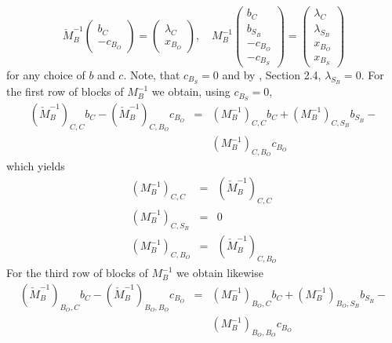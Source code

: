 \documentclass[a4paper]{article}
\begin{document}
\begin{equation}
\check{M}_{B}^{-1}
\left(\begin{array}{c}
        b_{C} \\
	\hline
	-c_{B_{O}}
       \end{array}
\right)
=
\left(\begin{array}{c}
        \lambda_{C} \\
	\hline
	x_{B_{O}}
      \end{array}
\right), 
\quad
M_{B}^{-1}
\left(\begin{array}{c}
        b_{C} \\
	\hline
	b_{S_{B}} \\
	\hline
	-c_{B_{O}} \\
	\hline
	-c_{B_{S}}
       \end{array}
\right)
=
\left(\begin{array}{c}
        \lambda_{C} \\
	\hline
	\lambda_{S_{B}} \\
	\hline
	x_{B_{O}}  \\
	\hline
	x_{B_{S}}
       \end{array}
\right)
\end{equation}
for any choice of $b$ and $c$. Note, that $c_{B_{S}}=0$ and by \cite{Sven},
Section 2.4, $\lambda_{S_{B}}=0$. 
For the first row of blocks of $M_{B}^{-1}$ we obtain, using $c_{B_{S}}=0$,
\begin{eqnarray*}
\left(\check{M}_{B}^{-1}\right)_{C, C} b_{C}
 -\left(\check{M}_{B}^{-1}\right)_{C, B_{O}} c_{B_{O}}
&=&   
\left(M_{B}^{-1}\right)_{C, C} b_{C}
 +\left(M_{B}^{-1}\right)_{C, S_{B}} b_{S_{B}} - \\
&& 
 \left(M_{B}^{-1}\right)_{C, B_{O}} c_{B_{O}}
\end{eqnarray*}
which yields
\begin{eqnarray}
\label{eq:M_B_inv_exp_CxC}
\left(M_{B}^{-1}\right)_{C,C} &=& \left(\check{M}_{B}^{-1}\right)_{C,C} \\
\label{eq:M_B_inv_exp_CxS_B}
\left(M_{B}^{-1}\right)_{C,S_{B}} &=& 0 \\
\left(M_{B}^{-1}\right)_{C,B_{O}}&=&\left(\check{M}_{B}^{-1}\right)_{C,B_{O}}
\nonumber
\end{eqnarray}
For the third row of blocks of $M_{B}^{-1}$ we obtain likewise
\begin{eqnarray*}
\left(\check{M}_{B}^{-1}\right)_{B_{O}, C} b_{C}
 -\left(\check{M}_{B}^{-1}\right)_{B_{O}, B_{O}} c_{B_{O}}
&=&   
\left(M_{B}^{-1}\right)_{B_{O}, C} b_{C}
 +\left(M_{B}^{-1}\right)_{B_{O}, S_{B}} b_{S_{B}} - \\
&& 
 \left(M_{B}^{-1}\right)_{B_{O}, B_{O}} c_{B_{O}}
\end{eqnarray*}
\end{document}
